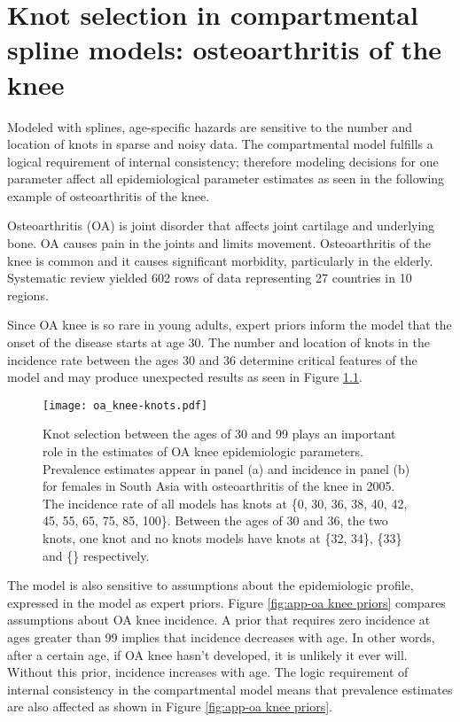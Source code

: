 \chapter{Knot selection in compartmental spline models: osteoarthritis of the knee}
\label{applications-con_fit_splines}

Modeled with splines, age-specific hazards are sensitive to the number
and location of knots in sparse and noisy data.  The compartmental
model fulfills a logical requirement of internal consistency;
therefore modeling decisions for one parameter affect all
epidemiological parameter estimates as seen in the following example
of osteoarthritis of the knee.

Osteoarthritis (OA) is joint disorder that affects joint cartilage and
underlying bone.  OA causes pain in the joints and limits movement.
Osteoarthritis of the knee is common and it causes significant
morbidity, particularly in the
elderly. \cite{felson_epidemiology_1988, felson_incidence_1995}
Systematic review yielded 602 rows of data representing 27 countries
in 10 regions.

Since OA knee is so rare in young adults, expert priors inform the
model that the onset of the disease starts at age 30.  The number and
location of knots in the incidence rate between the ages 30 and 36
determine critical features of the model and may produce unexpected
results as seen in Figure \ref{fig:app-oa knee knots}.

    \begin{figure}[h]
        \begin{center}
            \texttt{[image: oa\_knee-knots.pdf]}
            \caption{Knot selection between the ages of 30 and 99
              plays an important role in the estimates of OA knee
              epidemiologic parameters.  Prevalence estimates appear
              in panel (a) and incidence in panel (b) for females in
              South Asia with osteoarthritis of the knee in 2005.  The
              incidence rate of all models has knots at \{0, 30, 36,
              38, 40, 42, 45, 55, 65, 75, 85, 100\}.  Between the ages
              of 30 and 36, the two knots, one knot and no knots
              models have knots at \{32, 34\}, \{33\} and \{\}
              respectively.}
            \label{fig:app-oa knee knots}
        \end{center}
    \end{figure}

The model is also sensitive to assumptions about the epidemiologic
profile, expressed in the model as expert priors.  Figure
\ref{fig:app-oa knee priors} compares assumptions about OA knee
incidence.  A prior that requires zero incidence at ages greater than
99 implies that incidence decreases with age.  In other words, after a
certain age, if OA knee hasn't developed, it is unlikely it ever
will. Without this prior, incidence increases with age.  The logic
requirement of internal consistency in the compartmental model means
that prevalence estimates are also affected as shown in Figure
\ref{fig:app-oa knee priors}.

